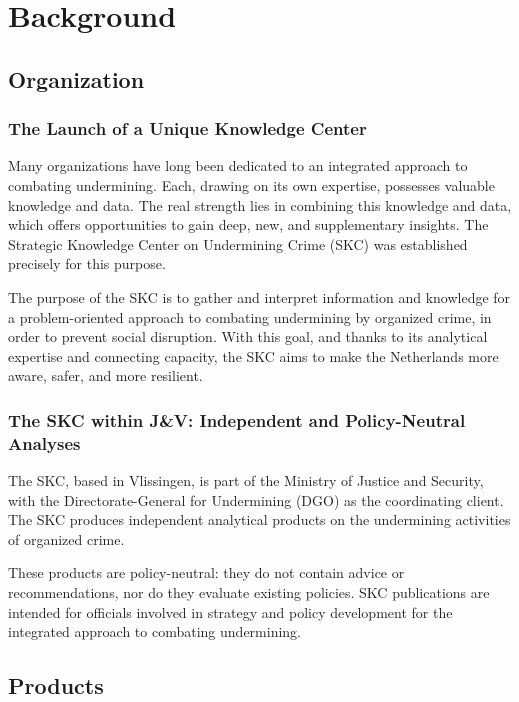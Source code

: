 \section{Background}
\label{sec:Background}

\subsection{Organization}
\label{subsec:Organization}

\subsubsection{The Launch of a Unique Knowledge Center}
Many organizations have long been dedicated to an integrated approach to combating undermining. Each, drawing on its own expertise, possesses valuable knowledge and data. The real strength lies in combining this knowledge and data, which offers opportunities to gain deep, new, and supplementary insights. The Strategic Knowledge Center on Undermining Crime (SKC) was established precisely for this purpose.

The purpose of the SKC is to gather and interpret information and knowledge for a problem-oriented approach to combating undermining by organized crime, in order to prevent social disruption. With this goal, and thanks to its analytical expertise and connecting capacity, the SKC aims to make the Netherlands more aware, safer, and more resilient.

\subsubsection{The SKC within J\&V: Independent and Policy-Neutral Analyses}
The SKC, based in Vlissingen, is part of the Ministry of Justice and Security, with the Directorate-General for Undermining (DGO) as the coordinating client. The SKC produces independent analytical products on the undermining activities of organized crime. 

These products are policy-neutral: they do not contain advice or recommendations, nor do they evaluate existing policies. SKC publications are intended for officials involved in strategy and policy development for the integrated approach to combating undermining.

\subsection{Products}
\label{subsec:Products}

